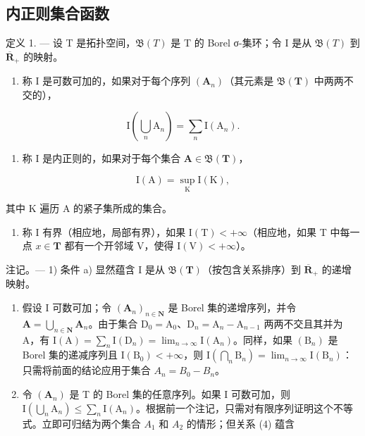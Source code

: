 \subsection{内正则集合函数}

定义 1. --- 设 T 是拓扑空间，\(\mathfrak{B}(T)\) 是 T 的 Borel σ-集环；令 I 是从 \(\mathfrak{B}(T)\) 到 \(\overline{\mathbf{R}}_{+}\) 的映射。

\begin{enumerate}
\def\labelenumi{\alph{enumi})}
\tightlist
\item
  称 I 是可数可加的，如果对于每个序列 \((\mathbf{A}_{n})\)（其元素是 \(\mathfrak{B}(\mathbf{T})\) 中两两不交的），
\end{enumerate}

\[
\mathrm{I} \left(\bigcup_ {n} \mathrm{A} _ {n}\right) = \sum_ {n} \mathrm{I} (\mathrm{A} _ {n}).\tag{4}
\]

\begin{enumerate}
\def\labelenumi{\alph{enumi})}
\setcounter{enumi}{1}
\tightlist
\item
  称 I 是内正则的，如果对于每个集合 \(\mathbf{A} \in \mathfrak{B}(\mathbf{T})\)，
\end{enumerate}

\[
\mathrm{I} (\mathrm{A}) = \sup _ {\mathrm{K}} \mathrm{I} (\mathrm{K}),\tag{5}
\]

其中 K 遍历 A 的紧子集所成的集合。

\begin{enumerate}
\def\labelenumi{\alph{enumi})}
\setcounter{enumi}{2}
\tightlist
\item
  称 I 有界（相应地，局部有界），如果 \(\mathrm{I(T)} < +\infty\)（相应地，如果 T 中每一点 \(x \in \mathbf{T}\) 都有一个开邻域 V，使得 \(\mathrm{I(V)} < +\infty\)）。
\end{enumerate}

注记。--- 1) 条件 a) 显然蕴含 I 是从 \(\mathfrak{B}(\mathbf{T})\)（按包含关系排序）到 \(\overline{\mathbf{R}}_{+}\) 的递增映射。

\begin{enumerate}
\def\labelenumi{\arabic{enumi})}
\setcounter{enumi}{1}
\item
  假设 I 可数可加；令 \((\mathbf{A}_n)_{n\in \mathbf{N}}\) 是 Borel 集的递增序列，并令 \(\mathbf{A} = \bigcup_{n\in \mathbf{N}}\mathbf{A}_n\)。由于集合 \(\mathrm{D}_0 = \mathrm{A}_0\)、\(\mathrm{D}_n = \mathrm{A}_n - \mathrm{A}_{n - 1}\) 两两不交且其并为 A，有 \(\mathrm{I}(\mathrm{A}) = \sum_{n} \mathrm{I}(\mathrm{D}_{n}) = \lim_{n \to \infty} \mathrm{I}(\mathrm{A}_{n})\)。同样，如果 \((\mathrm{B}_{n})\) 是 Borel 集的递减序列且 \(\mathrm{I}(\mathrm{B}_{0}) < +\infty\)，则 \(\mathrm{I}\left(\bigcap_{n} \mathrm{B}_{n}\right) = \lim_{n \to \infty} \mathrm{I}(\mathrm{B}_{n})\)：只需将前面的结论应用于集合 \(A_{n} = B_{0} - B_{n}\)。
\item
  令 \((\mathbf{A}_n)\) 是 T 的 Borel 集的任意序列。如果 I 可数可加，则 \(\mathrm{I}\left(\bigcup_{n} \mathrm{A}_n\right) \leqslant \sum_{n} \mathrm{I}(\mathrm{A}_n)\)。根据前一个注记，只需对有限序列证明这个不等式。立即可归结为两个集合 \(A_{1}\) 和 \(A_{2}\) 的情形；但关系 (4) 蕴含
\end{enumerate}

